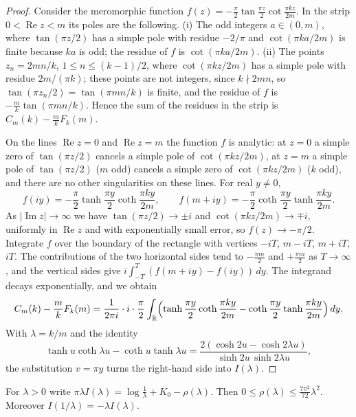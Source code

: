 \begin{proof}
Consider the meromorphic function $f(z)=-\frac\pi2\tan\frac{\pi z}2\cot\frac{\pi kz}{2m}$. In the strip $0<\operatorname{Re}z<m$ its poles are the following. (i) The odd integers $a\in(0,m)$, where $\tan(\pi z/2)$ has a simple pole with residue $-2/\pi$ and $\cot(\pi ka/2m)$ is finite because $ka$ is odd; the residue of $f$ is $\cot(\pi ka/2m)$. (ii) The points $z_n=2mn/k$, $1\le n\le(k{-}1)/2$, where $\cot(\pi kz/2m)$ has a simple pole with residue $2m/(\pi k)$; these points are not integers, since $k\nmid2mn$, so $\tan(\pi z_n/2)=\tan(\pi mn/k)$ is finite, and the residue of $f$ is $-\frac mk\tan(\pi mn/k)$. Hence the sum of the residues in the strip is $C_m(k)-\frac mkF_k(m)$.

On the lines $\operatorname{Re}z=0$ and $\operatorname{Re}z=m$ the function $f$ is analytic: at $z=0$ a simple zero of $\tan(\pi z/2)$ cancels a simple pole of $\cot(\pi kz/2m)$, at $z=m$ a simple pole of $\tan(\pi z/2)$ ($m$ odd) cancels a simple zero of $\cot(\pi kz/2m)$ ($k$ odd), and there are no other singularities on these lines. For real $y\ne0$,
\[
f(iy)=-\frac\pi2\tanh\frac{\pi y}2\coth\frac{\pi ky}{2m},\qquad f(m+iy)=-\frac\pi2\coth\frac{\pi y}2\tanh\frac{\pi ky}{2m}.
\]
As $|\operatorname{Im}z|\to\infty$ we have $\tan(\pi z/2)\to\pm i$ and $\cot(\pi kz/2m)\to\mp i$, uniformly in $\operatorname{Re}z$ and with exponentially small error, so $f(z)\to-\pi/2$. Integrate $f$ over the boundary of the rectangle with vertices $-iT$, $m-iT$, $m+iT$, $iT$. The contributions of the two horizontal sides tend to $-\frac{\pi m}2$ and $+\frac{\pi m}2$ as $T\to\infty$, and the vertical sides give $i\int_{-T}^T(f(m+iy)-f(iy))\,dy$. The integrand decays exponentially, and we obtain
\[
C_m(k)-\frac mkF_k(m)=\frac1{2\pi i}\cdot i\cdot\frac\pi2\int_{\mathbb{R}}\Bigl(\tanh\frac{\pi y}2\coth\frac{\pi ky}{2m}-\coth\frac{\pi y}2\tanh\frac{\pi ky}{2m}\Bigr)\,dy.
\]
With $\lambda=k/m$ and the identity
\begin{equation}\label{eq:tanh-identity}
\tanh u\coth\lambda u-\coth u\tanh\lambda u=\frac{2(\cosh2u-\cosh2\lambda u)}{\sinh2u\,\sinh2\lambda u},
\end{equation}
the substitution $v=\pi y$ turns the right-hand side into $I(\lambda)$.
\end{proof}

\begin{lemma}\label{lem:I-asymptotics}
For $\lambda>0$ write $\pi\lambda I(\lambda)=\log\frac1\lambda+K_0-\rho(\lambda)$. Then $0\le\rho(\lambda)\le\frac{7\pi^2}{72}\lambda^2$. Moreover $I(1/\lambda)=-\lambda I(\lambda)$.
\end{lemma}

